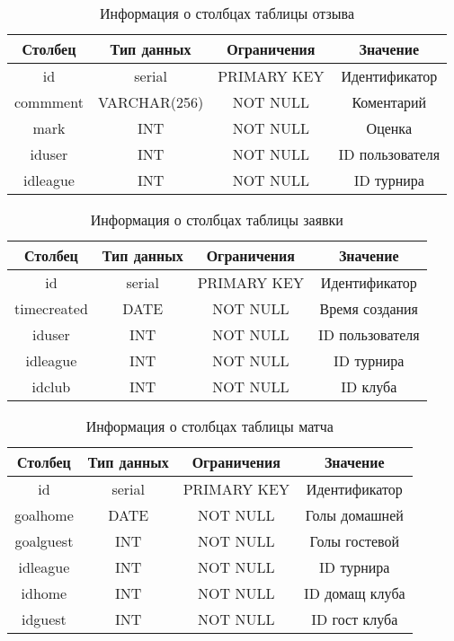 \begin{table}[H]
	\begin{center}
		\caption{Информация о столбцах таблицы отзыва}
		\begin{tabular}{|c|c|c|c|}
			\hline
			Столбец & Тип данных & Ограничения & Значение \\
			\hline
			id & serial & PRIMARY KEY & Идентификатор \\
			\hline
			commment & VARCHAR(256) & NOT NULL & Коментарий \\
			\hline
			mark & INT & NOT NULL & Оценка \\
			\hline
			iduser & INT & NOT NULL & ID пользователя \\
			\hline
			idleague & INT & NOT NULL & ID турнира \\
			\hline
		\end{tabular}
		\label{table:db:feedback}
	\end{center}
\end{table}

\begin{table}[H]
	\begin{center}
		\caption{Информация о столбцах таблицы заявки}
		\begin{tabular}{|c|c|c|c|}
			\hline
			Столбец & Тип данных & Ограничения & Значение \\
			\hline
			id & serial & PRIMARY KEY & Идентификатор \\
			\hline
			timecreated & DATE & NOT NULL & Время создания \\
			\hline
			iduser & INT & NOT NULL & ID пользователя \\
			\hline
			idleague & INT & NOT NULL & ID турнира \\
			\hline
			idclub & INT & NOT NULL & ID клуба \\
			\hline
		\end{tabular}
		\label{table:db:request}
	\end{center}
\end{table}

\begin{table}[H]
	\begin{center}
		\caption{Информация о столбцах таблицы матча}
		\begin{tabular}{|c|c|c|c|}
			\hline
			Столбец & Тип данных & Ограничения & Значение \\
			\hline
			id & serial & PRIMARY KEY & Идентификатор \\
			\hline
			goalhome & DATE & NOT NULL & Голы домашней \\
			\hline
			goalguest & INT & NOT NULL & Голы гостевой \\
			\hline
			idleague & INT & NOT NULL & ID турнира \\
			\hline
			idhome & INT & NOT NULL & ID домащ клуба \\
			\hline
			idguest & INT & NOT NULL & ID гост клуба \\
			\hline
		\end{tabular}
		\label{table:db:match}
	\end{center}
\end{table}

